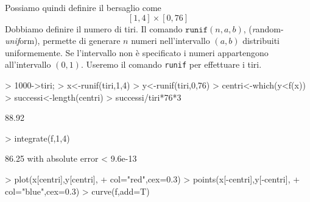 \documentclass[onecolumn,11pt]{book}
\begin{document}
Possiamo quindi definire il bersaglio come
$$[1,4]\times [0,76]$$
Dobbiamo definire il numero di tiri. 
Il comando $\texttt{runif}(n,a,b)$, ({\it r}andom-{\it unif}orm), permette di generare $n$ numeri nell'intervallo $(a,b)$ distribuiti uniformemente. Se l'intervallo non \`e specificato i numeri appartengono all'intervallo $(0,1)$.
Useremo il comando  \texttt{runif} per effettuare i tiri.

\par
\begin{Schunk}
\begin{Sinput}
> 1000->tiri;
> x<-runif(tiri,1,4)		 
> y<-runif(tiri,0,76)
> centri<-which(y<f(x))	 
> successi<-length(centri)
> successi/tiri*76*3                    
\end{Sinput}
\begin{Soutput}
[1] 88.92
\end{Soutput}
\begin{Sinput}
> integrate(f,1,4)
\end{Sinput}
\begin{Soutput}
86.25 with absolute error < 9.6e-13
\end{Soutput}
\begin{Sinput}
> plot(x[centri],y[centri],
+ col="red",cex=0.3)   
> points(x[-centri],y[-centri],
+ col="blue",cex=0.3)  
> curve(f,add=T)		
\end{Sinput}
\end{Schunk}
\end{document}
